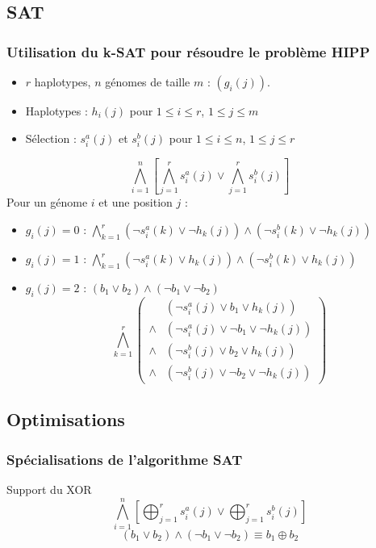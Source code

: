 \documentclass{beamer}
\begin{document}
\subsection{SAT}
\begin{frame}
    \frametitle{Utilisation du k-SAT pour résoudre le problème HIPP}
    \begin{itemize}
        \item $r$ haplotypes, $n$ génomes de taille $m$ : $(g_i(j))$.
        \item Haplotypes : $h_i(j)$ pour $1\leq i\leq r$, $1\leq j\leq m$
        \item Sélection : $s^a_i(j)$ et $s^b_i(j)$ pour $1\leq i\leq n$, $1\leq j\leq r$
    \end{itemize}
    \[ \bigwedge_{i=1}^n\left[\bigwedge_{j=1}^r s^a_i(j) \vee \bigwedge_{j=1}^r s^b_i(j)\right] \]
    Pour un génome $i$ et une position $j$ : \begin{itemize}
        \item $g_i(j) = 0$ : $\bigwedge_{k=1}^r (\neg s^a_i(k)\vee \neg h_k(j)) \wedge (\neg s^b_i(k)\vee \neg h_k(j))$
        \item $g_i(j) = 1$ : $\bigwedge_{k=1}^r (\neg s^a_i(k)\vee h_k(j)) \wedge (\neg s^b_i(k)\vee h_k(j))$
        \item $g_i(j) = 2$ : $(b_1\vee b_2) \wedge (\neg b_1\vee \neg b_2)$
            \[\bigwedge_{k=1}^r \left(\begin{array}{cl}
                        & (\neg s^a_i(j)\vee b_1 \vee h_k(j)) \\
                 \wedge & (\neg s^a_i(j)\vee \neg b_1\vee \neg h_k(j)) \\
                 \wedge & (\neg s^b_i(j)\vee b_2 \vee h_k(j)) \\
                 \wedge & (\neg s^b_i(j)\vee \neg b_2 \vee \neg h_k(j))
            \end{array}\right)\]
    \end{itemize}
\end{frame}

\subsection{Optimisations}
\begin{frame}
    \frametitle{Spécialisations de l'algorithme SAT}
    \begin{block}{Support du XOR}
        \[ \bigwedge_{i=1}^n\left[\bigoplus_{j=1}^r s^a_i(j) \vee \bigoplus_{j=1}^r s^b_i(j)\right] \]
        \[ (b_1 \vee b_2) \wedge (\neg b_1 \vee \neg b_2) \equiv b_1\oplus b_2 \]
    \end{block}
\end{frame}
\end{document}
